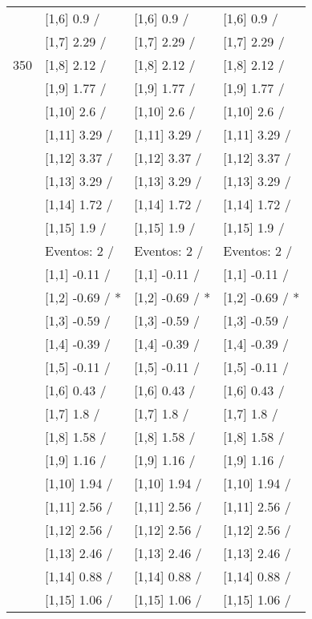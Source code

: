 \begin{table}
\begin{tabular}[t]{llll}
 & {}[1,6] 0.9  / & {}[1,6] 0.9  / & {}[1,6] 0.9  /\\
 & {}[1,7] 2.29  / & {}[1,7] 2.29  / & {}[1,7] 2.29  /\\
350 & {}[1,8] 2.12  / & {}[1,8] 2.12  / & {}[1,8] 2.12  /\\
\addlinespace
 & {}[1,9] 1.77  / & {}[1,9] 1.77  / & {}[1,9] 1.77  /\\
 & {}[1,10] 2.6  / & {}[1,10] 2.6  / & {}[1,10] 2.6  /\\
 & {}[1,11] 3.29  / & {}[1,11] 3.29  / & {}[1,11] 3.29  /\\
 & {}[1,12] 3.37  / & {}[1,12] 3.37  / & {}[1,12] 3.37  /\\
 & {}[1,13] 3.29  / & {}[1,13] 3.29  / & {}[1,13] 3.29  /\\
\addlinespace
 & {}[1,14] 1.72  / & {}[1,14] 1.72  / & {}[1,14] 1.72  /\\
 & {}[1,15] 1.9  / & {}[1,15] 1.9  / & {}[1,15] 1.9  /\\
 & Eventos:  2 / & Eventos:  2 / & Eventos:  2 /\\
 & {}[1,1] -0.11  / & {}[1,1] -0.11  / & {}[1,1] -0.11  /\\
 & {}[1,2] -0.69  / * & {}[1,2] -0.69  / * & {}[1,2] -0.69  / *\\
\addlinespace
 & {}[1,3] -0.59  / & {}[1,3] -0.59  / & {}[1,3] -0.59  /\\
 & {}[1,4] -0.39  / & {}[1,4] -0.39  / & {}[1,4] -0.39  /\\
 & {}[1,5] -0.11  / & {}[1,5] -0.11  / & {}[1,5] -0.11  /\\
 & {}[1,6] 0.43  / & {}[1,6] 0.43  / & {}[1,6] 0.43  /\\
 & {}[1,7] 1.8  / & {}[1,7] 1.8  / & {}[1,7] 1.8  /\\
\addlinespace
500 & {}[1,8] 1.58  / & {}[1,8] 1.58  / & {}[1,8] 1.58  /\\
 & {}[1,9] 1.16  / & {}[1,9] 1.16  / & {}[1,9] 1.16  /\\
 & {}[1,10] 1.94  / & {}[1,10] 1.94  / & {}[1,10] 1.94  /\\
 & {}[1,11] 2.56  / & {}[1,11] 2.56  / & {}[1,11] 2.56  /\\
 & {}[1,12] 2.56  / & {}[1,12] 2.56  / & {}[1,12] 2.56  /\\
\addlinespace
 & {}[1,13] 2.46  / & {}[1,13] 2.46  / & {}[1,13] 2.46  /\\
 & {}[1,14] 0.88  / & {}[1,14] 0.88  / & {}[1,14] 0.88  /\\
 & {}[1,15] 1.06  / & {}[1,15] 1.06  / & {}[1,15] 1.06  /\\
\bottomrule
\end{tabular}
\end{table}
